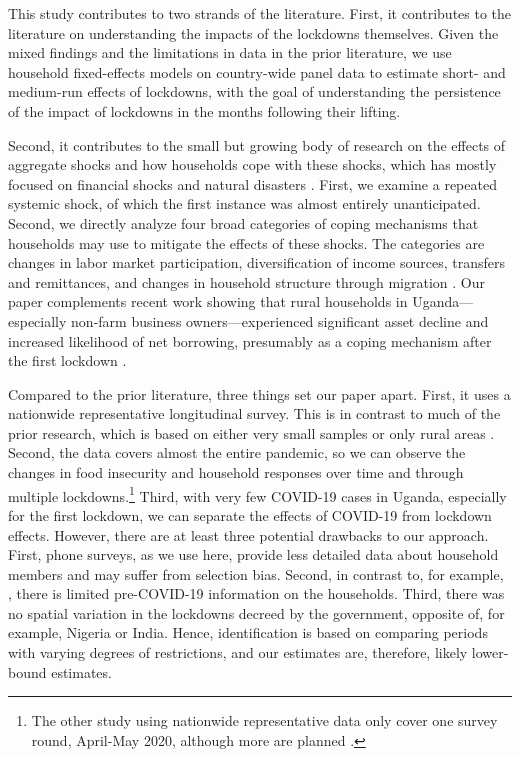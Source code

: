 \documentclass{wber}
\begin{document}
This study contributes to two strands of the literature. First, it
contributes to the literature on understanding the impacts of the
lockdowns themselves. Given the mixed findings and the limitations in
data in the prior literature, we use household fixed-effects models on
country-wide panel data to estimate short- and medium-run effects of
lockdowns, with the goal of understanding the persistence of the impact
of lockdowns in the months following their lifting.

Second, it contributes to the small but growing body of research on the
effects of aggregate shocks and how households cope with these shocks,
which has mostly focused on financial shocks and natural disasters
\citep{Del-Ninno2003, Fallon2002, Glewwe1998, Hallegatte2020, McKenzie2003, Skoufias2003, Thomas2007}.
First, we examine a repeated systemic shock, of which the first instance
was almost entirely unanticipated. Second, we directly analyze four
broad categories of coping mechanisms that households may use to
mitigate the effects of these shocks. The categories are changes in
labor market participation, diversification of income sources, transfers
and remittances, and changes in household structure through migration
\citep{Foster2002, Jayachandran2006, Kochar1999, McKenzie2003, Morduch1995, Townsend1994, Yang2007}.
Our paper complements recent work showing that rural households in
Uganda---especially non-farm business owners---experienced significant
asset decline and increased likelihood of net borrowing, presumably as a
coping mechanism after the first lockdown \citep{Mahmud2023}.

Compared to the prior literature, three things set our paper apart.
First, it uses a nationwide representative longitudinal survey. This is
in contrast to much of the prior research, which is based on either very
small samples
\citep{Ruszczyk2021, Squarcina2022, Hirvonen2021, Nguyen2021a} or only
rural areas \citep{Janssens2021, Aggarwal2022}. Second, the data covers
almost the entire pandemic, so we can observe the changes in food
insecurity and household responses over time and through multiple
lockdowns.\footnote{The other study using nationwide representative data
  only cover one survey round, April-May 2020, although more are planned
  \citep{Amare2021}.} Third, with very few COVID-19 cases in Uganda,
especially for the first lockdown, we can separate the effects of
COVID-19 from lockdown effects. However, there are at least three
potential drawbacks to our approach. First, phone surveys, as we use
here, provide less detailed data about household members and may suffer
from selection bias. Second, in contrast to, for example,
\citet{Amare2021}, there is limited pre-COVID-19 information on the
households. Third, there was no spatial variation in the lockdowns
decreed by the government, opposite of, for example, Nigeria or India.
Hence, identification is based on comparing periods with varying degrees
of restrictions, and our estimates are, therefore, likely lower-bound
estimates.
\end{document}
